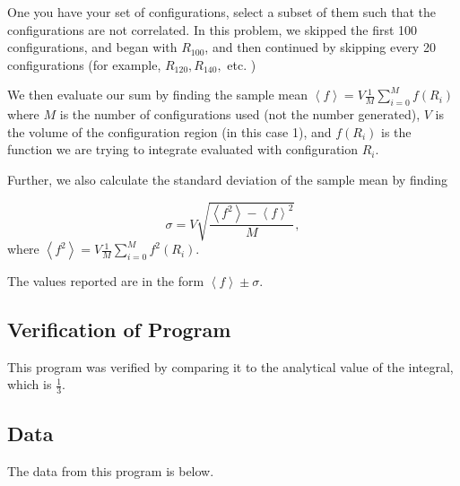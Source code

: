 \documentclass[10pt,letter]{article}
\begin{document}
One you have your set of configurations, select a subset of them such that the configurations are not correlated. In this problem, we skipped the first 100 configurations, and began with $R_100$, and then continued by skipping every 20 configurations (for example, $R_{120}, R_{140},$ etc. )

We then evaluate our sum by finding the sample mean $\left\langle f \right\rangle = V\frac{1}{M}\sum_{i=0}^M f(R_i)$ where $M$ is the number of configurations used (not the number generated), $V$ is the volume of the configuration region (in this case 1), and $f(R_i)$ is the function we are trying to integrate evaluated with configuration $R_i$.

Further, we also calculate the standard deviation of the sample mean by finding 

$$ \sigma = V\sqrt{ \frac{\left\langle f^2 \right\rangle - \left\langle f \right\rangle^2}{M}},$$where $\left\langle f^2 \right\rangle = V\frac{1}{M}\sum_{i=0}^M f^2(R_i)$.

The values reported are in the form $\left\langle f \right\rangle \pm \sigma$.

\subsection{Verification of Program}

This program was verified by comparing it to the analytical value of the integral, which is $\frac{1}{3}$.

\subsection{Data}

The data from this program is below.
\end{document}
